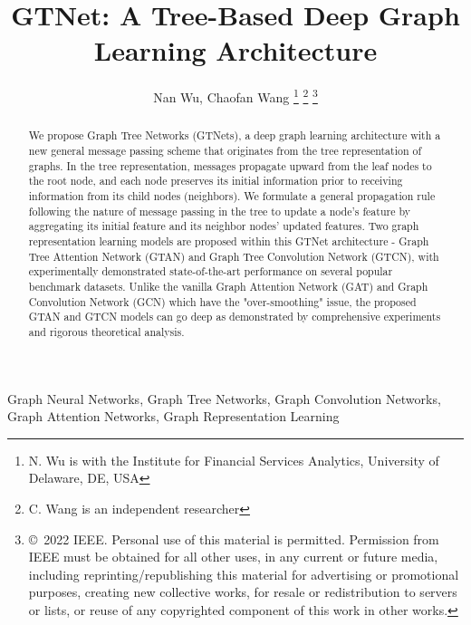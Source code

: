 \documentclass[lettersize,journal]{IEEEtran}
\theoremstyle{plain}
\theoremstyle{definition}
\theoremstyle{remark}
\begin{document}
\title{GTNet: A Tree-Based Deep Graph Learning Architecture}



\author{Nan Wu,
	 Chaofan Wang
	\thanks{N. Wu is with the Institute
		for Financial Services Analytics, University of Delaware, DE,
		USA}
	\thanks{C. Wang is an independent researcher}
	\thanks{\copyright~2022 IEEE. Personal use of this material is permitted. Permission from IEEE must be obtained for all other uses, in any current or future media, including reprinting/republishing this material for advertising or promotional purposes, creating new collective works, for resale or redistribution to servers or lists, or reuse of any copyrighted component of this work in other works.}
}







\maketitle

\begin{abstract}
We propose Graph Tree Networks (GTNets), a deep graph learning architecture with a new general message passing scheme that originates from the tree representation of graphs. In the tree representation, messages propagate upward from the leaf nodes to the root node, and each node preserves its initial information prior to receiving information from its child nodes (neighbors). We formulate a general propagation rule following the nature of message passing in the tree to update a node's feature by aggregating its initial feature and its neighbor nodes' updated features. Two graph representation learning models are proposed within this GTNet architecture - Graph Tree Attention Network (GTAN) and  Graph Tree Convolution Network (GTCN), with experimentally demonstrated state-of-the-art performance on several popular benchmark datasets. Unlike the vanilla Graph Attention Network (GAT) and Graph Convolution Network (GCN) which have the "over-smoothing" issue, the proposed GTAN and GTCN models can go deep as demonstrated by comprehensive experiments and rigorous theoretical analysis.
\end{abstract}

\begin{IEEEkeywords}
Graph Neural Networks, Graph Tree Networks, Graph Convolution Networks, Graph Attention Networks, Graph Representation Learning
\end{IEEEkeywords}
\end{document}
